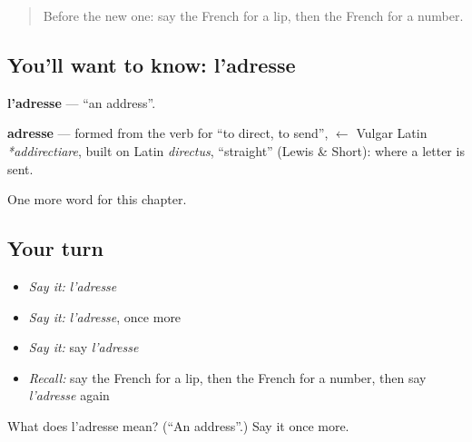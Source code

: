 \begin{quote}
Before the new one: say the French for a lip, then the French for a number.
\end{quote}

\subsection*{You'll want to know: l'adresse}
\textbf{l'adresse} — \textquotedblleft{}an address\textquotedblright{}.

\begin{cousinweb}
\textbf{adresse} — formed from the verb for \textquotedblleft{}to direct, to send\textquotedblright{}, $\leftarrow$ Vulgar Latin \emph{*addirectiare}, built on Latin \emph{directus}, \textquotedblleft{}straight\textquotedblright{} (Lewis \& Short): where a letter is sent.
\end{cousinweb}

\begin{grammarlens}[title={What you've built}]
One more word for this chapter.
\end{grammarlens}

\subsection*{Your turn}
\begin{itemize}
\raggedright
  \item \emph{Say it:} \emph{l'adresse}
  \item \emph{Say it:} \emph{l'adresse}, once more
  \item \emph{Say it:} say \emph{l'adresse}
  \item \emph{Recall:} say the French for a lip, then the French for a number, then say \emph{l'adresse} again
\end{itemize}

\begin{tcolorbox}[breakable,colback=teal!4,colframe=teal!35!black,title={Before you move on}]
What does l'adresse mean? (\textquotedblleft{}An address\textquotedblright{}.) Say it once more.
\end{tcolorbox}

